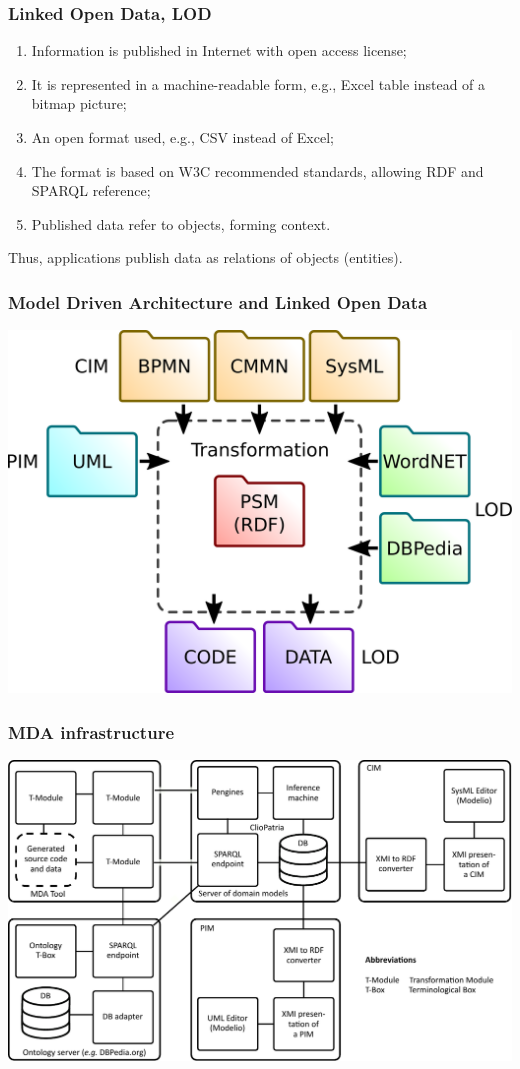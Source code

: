 \documentclass[10pt]{beamer}
\begin{document}
\begin{frame}
  \frametitle{Linked Open Data, LOD}
  \begin{enumerate}
  \item Information is published in Internet with open access license;
  \item It is represented in a machine-readable form, e.g., Excel table instead of a bitmap picture;
  \item An open format used, e.g., CSV instead of Excel;
  \item The format is based on W3C recommended standards, allowing RDF and SPARQL reference;
  \item Published data refer to objects, forming context.
  \end{enumerate}
  Thus, applications publish data as relations of objects (entities).
\end{frame}

\begin{frame}
  \frametitle{Model Driven Architecture and Linked Open Data}
  \begin{center}
    \includegraphics[width=0.9\linewidth]{mda-overview.pdf}
  \end{center}
\end{frame}

\begin{frame}
  \frametitle{MDA infrastructure}
  \centering
  \includegraphics[width=1\linewidth]{architecture-mda-lod-ext.pdf}
\end{frame}
\end{document}
